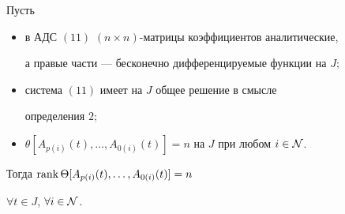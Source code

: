 \begin{lem}


Пусть


\begin{itemize}


\item[1)] в АДС $(11)$ $(n \times n)$-матрицы коэффициентов аналитические, 


а правые части --- бесконечно дифференцируемые функции на $J;$


\item[2)] система $(11)$ имеет на $J$ общее решение в смысле 


определения $2;$


\item[3)] $\theta [A_{p(i)}(t), \dotsc,


A_{0(i)}(t)]=n$ на $J$ при любом $i\in \cal N$.


\end{itemize}





\noindent{}Тогда $\operatorname{rank} \Theta[A_{p(i)}(t), \dotsc, A_{0(i)}(t)]=n$ \;


$\forall t \in J$, \; $\forall i \in \cal N$.


\end{lem}





